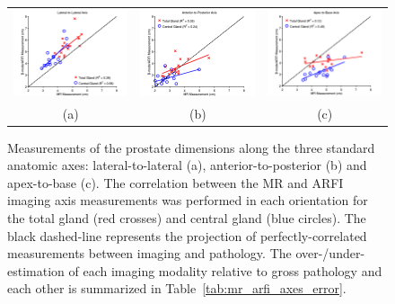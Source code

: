 \begin{figure}[htb!]
\centering
\begin{tabular}{ccc}
\includegraphics[width=0.3\linewidth]{figs/Imaging_Lateral-to-Lateral} &
\includegraphics[width=0.3\linewidth]{figs/Imaging_Anterior-to-Posterior} &
\includegraphics[width=0.3\linewidth]{figs/Imaging_Apex-to-Base} \\
(a) & (b) & (c) \\
\end{tabular}
\caption{Measurements of the prostate dimensions along the three standard
    anatomic axes: lateral-to-lateral (a), anterior-to-posterior (b) and
    apex-to-base (c).  The correlation between the MR and ARFI imaging axis
    measurements was performed in each orientation for the total gland (red
    crosses) and central gland (blue circles).  The black dashed-line represents
    the projection of perfectly-correlated measurements between imaging and
    pathology.  The over-/under-estimation of each imaging modality relative to
    gross pathology and each other is summarized in
    Table~\ref{tab:mr_arfi_axes_error}.} 
\label{fig:mr_arfi_path_axes}
\end{figure}
